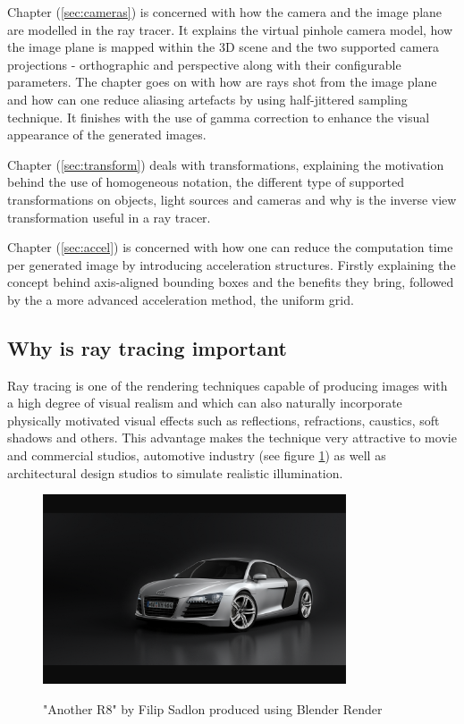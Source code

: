 \documentclass{article}
\begin{document}
\vspace*{\baselineskip}

Chapter (\ref{sec:cameras}) is concerned with how the camera and the image plane are modelled in the ray tracer. It explains the virtual pinhole camera model, how the image plane is mapped within the 3D scene and the two supported camera projections - orthographic and perspective along with their configurable parameters. The chapter goes on with how are rays shot from the image plane and how can one reduce aliasing artefacts by using half-jittered sampling technique. It finishes with the use of gamma correction to enhance the visual appearance of the generated images. 

\vspace*{\baselineskip}

Chapter (\ref{sec:transform}) deals with transformations, explaining the motivation behind the use of homogeneous notation, the different type of supported transformations on objects, light sources and cameras and why is the inverse view transformation useful in a ray tracer.
%
\vspace*{\baselineskip}

Chapter (\ref{sec:accel}) is concerned with how one can reduce the computation time per generated image by introducing acceleration structures. Firstly explaining the concept behind axis-aligned bounding boxes and the benefits they bring, followed by the a more advanced acceleration method, the uniform grid.

\subsection{Why is ray tracing important}
Ray tracing is one of the rendering techniques capable of producing images with a high degree of visual realism and which can also naturally incorporate physically motivated visual effects such as reflections, refractions, caustics, soft shadows and others. This advantage makes the technique very attractive to movie and commercial studios, automotive industry (see figure \ref{fig:audi}) as well as architectural design studios to simulate realistic illumination.  

\begin{figure}[h!]
    \caption{"Another R8" by Filip Sadlon produced using Blender Render}
    \includegraphics[width=0.8\textwidth]{audi}
    \label{fig:audi}
\end{figure}
\end{document}
